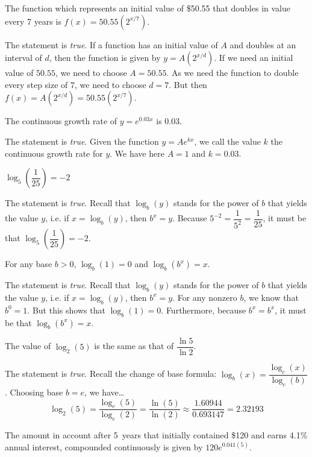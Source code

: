 \documentclass[11pt,letterpaper]{article}
\begin{document}
 The function which represents an initial value of \$50.55 that doubles in value every 7 years is $f(x)= 50.55 (2^{x/7})$. \pspace

\sol The statement is \textit{true}. If a function has an initial value of $A$ and doubles at an interval of $d$, then the function is given by $y= A(2^{x/d})$. If we need an initial value of $50.55$, we need to choose $A= 50.55$. As we need the function to double every step size of $7$, we need to choose $d= 7$. But then $f(x)= A(2^{x/d})= 50.55(2^{x/7})$. \pvspace{1.3cm}



 The continuous growth rate of $y= e^{0.03x}$ is $0.03$. \pspace

\sol The statement is \textit{true}. Given the function $y= Ae^{kx}$, we call the value $k$ the continuous growth rate for $y$. We have here $A= 1$ and $k= 0.03$. \pvspace{1.3cm}



 $\log_5 \left( \dfrac{1}{25} \right)= -2$ \pspace

\sol The statement is \textit{true}. Recall that $\log_b(y)$ stands for the power of $b$ that yields the value $y$, i.e. if $x= \log_b(y)$, then $b^x= y$. Because $5^{-2}= \dfrac{1}{5^2}= \dfrac{1}{25}$, it must be that $\log_5 \left( \dfrac{1}{25} \right)= -2$. \pvspace{1.3cm}



 For any base $b > 0$, $\log_b(1)= 0$ and $\log_b(b^x)= x$. \pspace

\sol The statement is \textit{true}. Recall that $\log_b(y)$ stands for the power of $b$ that yields the value $y$, i.e. if $x= \log_b(y)$, then $b^x= y$. For any nonzero $b$, we know that $b^0= 1$. But this shows that $\log_b(1)= 0$. Furthermore, because $b^x= b^x$, it must be that $\log_b(b^x)= x$. \pvspace{1.3cm}



 The value of $\log_2(5)$ is the same as that of $\dfrac{\ln 5}{\ln 2}$. \pspace

\sol The statement is \textit{true}. Recall the change of base formula: $\log_b(x)= \dfrac{\log_c(x)}{\log_c(b)}$. Choosing base $b= e$, we have\dots
	\[
	\log_2(5)= \dfrac{\log_e(5)}{\log_e(2)}= \dfrac{\ln(5)}{\ln(2)} \approx \dfrac{1.60944}{0.693147}= 2.32193
	\] \pvspace{1.3cm}



 The amount in account after 5~years that initially contained \$120 and earns 4.1\% annual interest, compounded continuously is given by $120 e^{0.041(5)}$. \pspace
\end{document}
